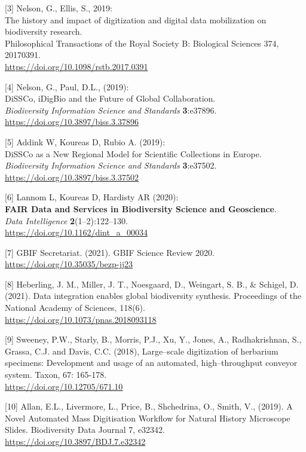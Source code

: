 {[}3{]} Nelson, G., Ellis, S., 2019:\\
The history and impact of digitization and digital data mobilization on
biodiversity research.\\
Philosophical Transactions of the Royal Society B: Biological Sciences
374, 20170391.\\
\url{https://doi.org/10.1098/rstb.2017.0391}

{[}4{]} Nelson, G., Paul, D.L., (2019):\\
DiSSCo, iDigBio and the Future of Global Collaboration.\\
\emph{Biodiversity Information Science and Standards}
\textbf{3}:e37896.\\
\url{https://doi.org/10.3897/biss.3.37896}

{[}5{]} Addink W, Koureas D, Rubio A. (2019):\\
DiSSCo as a New Regional Model for Scientific Collections in Europe.
\emph{Biodiversity Information Science and Standards}
\textbf{3}:e37502.\\
\url{https://doi.org/10.3897/biss.3.37502}

{[}6{]} Lannom L, Koureas D, Hardisty AR (2020):\\
\textbf{FAIR Data and Services in Biodiversity Science and
Geoscience}.\\
\emph{Data Intelligence} \textbf{2}(1--2):122--130.\\
\url{https://doi.org/10.1162/dint_a_00034}

{[}7{]} GBIF Secretariat. (2021). GBIF Science Review 2020.\\
\url{https://doi.org/10.35035/bezp-jj23}

{[}8{]} Heberling, J. M., Miller, J. T., Noesgaard, D., Weingart, S. B.,
\& Schigel, D. (2021). Data integration enables global biodiversity
synthesis. Proceedings of the National Academy of Sciences, 118(6).\\
\url{https://doi.org/10.1073/pnas.2018093118}

{[}9{]} Sweeney, P.W., Starly, B., Morris, P.J., Xu, Y., Jones, A.,
Radhakrishnan, S., Grassa, C.J. and Davis, C.C. (2018), Large--scale
digitization of herbarium specimens: Development and usage of an
automated, high--throughput conveyor system. Taxon, 67: 165-178.\\
\url{https://doi.org/10.12705/671.10}

{[}10{]} Allan, E.L., Livermore, L., Price, B., Shchedrina, O., Smith,
V., (2019). A Novel Automated Mass Digitisation Workflow for Natural
History Microscope Slides. Biodiversity Data Journal 7, e32342.\\
\url{https://doi.org/10.3897/BDJ.7.e32342}

